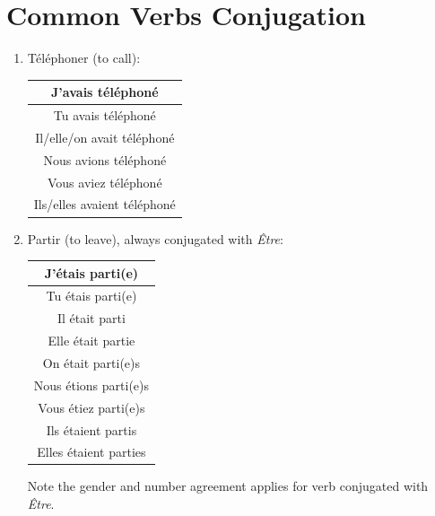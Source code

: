 \documentclass{book}
\begin{document}
    \section{Common Verbs Conjugation}
        \begin{enumerate}
            \item Téléphoner (to call):
                \begin{center}
                    \begin{tabular}{|c|}
                        \hline
                        J'avais téléphoné \\
                        \hline
                        Tu avais téléphoné \\
                        \hline
                        Il/elle/on avait téléphoné \\
                        \hline
                        Nous avions téléphoné \\
                        \hline
                        Vous aviez téléphoné \\
                        \hline
                        Ils/elles avaient téléphoné \\
                        \hline
                    \end{tabular}
                \end{center}

            \item Partir (to leave), always conjugated with \textit{Être}:
                \begin{center}
                    \begin{tabular}{|c|}
                        \hline
                        J'étais parti(e) \\
                        \hline
                        Tu étais parti(e) \\
                        \hline
                        Il était parti \\
                        \hline
                        Elle était partie \\
                        \hline
                        On était parti(e)s \\
                        \hline
                        Nous étions parti(e)s \\
                        \hline
                        Vous étiez parti(e)s \\
                        \hline
                        Ils étaient partis \\
                        \hline
                        Elles étaient parties \\
                        \hline
                    \end{tabular}
                \end{center}
                Note the gender and number agreement applies for verb conjugated with \textit{Être}.
        \end{enumerate}
\end{document}
